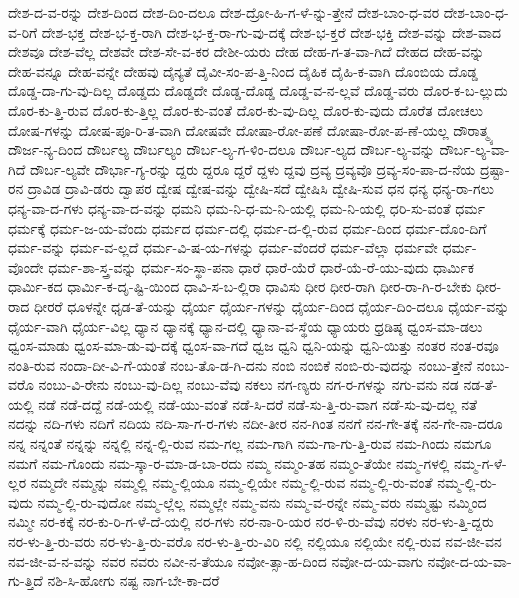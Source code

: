 {ದೇಶ-ದ-ವ-ರನ್ನು
ದೇಶ-ದಿಂದ
ದೇಶ-ದಿಂ-ದಲೂ
ದೇಶ-ದ್ರೋ-ಹಿ-ಗ-ಳೆ-ನ್ನು-ತ್ತೇನೆ
ದೇಶ-ಬಾಂ-ಧ-ವರ
ದೇಶ-ಬಾಂ-ಧ-ವ-ರಿಗೆ
ದೇಶ-ಭಕ್ತ
ದೇಶ-ಭ-ಕ್ತ-ರಾಗಿ
ದೇಶ-ಭ-ಕ್ತ-ರಾ-ಗು-ವು-ದಕ್ಕೆ
ದೇಶ-ಭ-ಕ್ತರೆ
ದೇಶ-ಭಕ್ತಿ
ದೇಶ-ವನ್ನು
ದೇಶ-ವಾದ
ದೇಶವೂ
ದೇಶ-ವೆಲ್ಲ
ದೇಶವೇ
ದೇಶ-ಸೇ-ವ-ಕರ
ದೇಶೀ-ಯರು
ದೇಹ
ದೇಹ-ಗ-ತ-ವಾ-ಗಿದೆ
ದೇಹದ
ದೇಹ-ವನ್ನು
ದೇಹ-ವನ್ನೂ
ದೇಹ-ವನ್ನೇ
ದೇಹವು
ದೈನ್ಯತೆ
ದೈವೀ-ಸಂ-ಪ-ತ್ತಿ-ನಿಂದ
ದೈಹಿಕ
ದೈಹಿ-ಕ-ವಾಗಿ
ದೊಂಬಿಯ
ದೊಡ್ಡ
ದೊಡ್ಡ-ದಾ-ಗು-ವು-ದಿಲ್ಲ
ದೊಡ್ಡದು
ದೊಡ್ಡದೇ
ದೊಡ್ಡ-ದೊಡ್ಡ
ದೊಡ್ಡ-ವ-ನ-ಲ್ಲವೆ
ದೊಡ್ಡ-ವರು
ದೊರ-ಕ-ಬ-ಲ್ಲುದು
ದೊರ-ಕು-ತ್ತಿ-ರುವ
ದೊರ-ಕು-ತ್ತಿಲ್ಲ
ದೊರ-ಕು-ವಂತೆ
ದೊರ-ಕು-ವು-ದಿಲ್ಲ
ದೊರ-ಕು-ವುದು
ದೊರೆತ
ದೋಚಲು
ದೋಷ-ಗಳನ್ನು
ದೋಷ-ಪೂ-ರಿ-ತ-ವಾಗಿ
ದೋಷವೇ
ದೋಷಾ-ರೋ-ಪಣೆ
ದೋಷಾ-ರೋ-ಪ-ಣೆ-ಯಲ್ಲ
ದೌರಾತ್ಮ್ಯ
ದೌರ್ಜ-ನ್ಯ-ದಿಂದ
ದೌರ್ಬಲ್ಯ
ದೌರ್ಬಲ್ಯಂ
ದೌರ್ಬ-ಲ್ಯ-ಗ-ಳಿಂ-ದಲೂ
ದೌರ್ಬ-ಲ್ಯದ
ದೌರ್ಬ-ಲ್ಯ-ವನ್ನು
ದೌರ್ಬ-ಲ್ಯ-ವಾ-ಗಿದೆ
ದೌರ್ಬ-ಲ್ಯವೇ
ದೌರ್ಭಾ-ಗ್ಯ-ರನ್ನು
ದ್ದರು
ದ್ದರೂ
ದ್ದರೆ
ದ್ದಳು
ದ್ದವು
ದ್ರವ್ಯ
ದ್ರವ್ಯವೊ
ದ್ರವ್ಯ-ಸಂ-ಪಾ-ದ-ನೆಯ
ದ್ರಷ್ಟಾ-ರನ
ದ್ರಾವಿಡ
ದ್ರಾವಿ-ಡರು
ದ್ವಾಪರ
ದ್ವೇಷ
ದ್ವೇಷ-ವನ್ನು
ದ್ವೇಷಿ-ಸದೆ
ದ್ವೇಷಿಸಿ
ದ್ವೇಷಿ-ಸುವ
ಧನ
ಧನ್ಯ
ಧನ್ಯ-ರಾ-ಗಲು
ಧನ್ಯ-ವಾ-ದ-ಗಳು
ಧನ್ಯ-ವಾ-ದ-ವನ್ನು
ಧಮನಿ
ಧಮ-ನಿ-ಧ-ಮ-ನಿ-ಯಲ್ಲಿ
ಧಮ-ನಿ-ಯಲ್ಲಿ
ಧರಿ-ಸು-ವಂತೆ
ಧರ್ಮ
ಧರ್ಮಕ್ಕೆ
ಧರ್ಮ-ಜ-ಯ-ವೆಂದು
ಧರ್ಮದ
ಧರ್ಮ-ದಲ್ಲಿ
ಧರ್ಮ-ದ-ಲ್ಲಿ-ರುವ
ಧರ್ಮ-ದಿಂದ
ಧರ್ಮ-ದೊಂ-ದಿಗೆ
ಧರ್ಮ-ವನ್ನು
ಧರ್ಮ-ವ-ಲ್ಲದೆ
ಧರ್ಮ-ವಿ-ಷ-ಯ-ಗಳನ್ನು
ಧರ್ಮ-ವೆಂದರೆ
ಧರ್ಮ-ವೆಲ್ಲಾ
ಧರ್ಮವೇ
ಧರ್ಮ-ವೊಂದೇ
ಧರ್ಮ-ಶಾ-ಸ್ತ್ರ-ವನ್ನು
ಧರ್ಮ-ಸಂ-ಸ್ಥಾ-ಪನಾ
ಧಾರೆ
ಧಾರೆ-ಯೆರೆ
ಧಾರೆ-ಯೆ-ರೆ-ಯು-ವುದು
ಧಾರ್ಮಿಕ
ಧಾರ್ಮಿ-ಕದ
ಧಾರ್ಮಿ-ಕ-ದೃ-ಷ್ಟಿ-ಯಿಂದ
ಧಾವಿ-ಸ-ಬ-ಲ್ಲಿರಾ
ಧಾವಿಸು
ಧೀರ
ಧೀರ-ರಾಗಿ
ಧೀರ-ರಾ-ಗಿ-ರ-ಬೇಕು
ಧೀರ-ರಾದ
ಧೀರರೆ
ಧೂಳನ್ನೇ
ಧೃಡ-ತೆ-ಯನ್ನು
ಧೈರ್ಯ
ಧೈರ್ಯ-ಗಳನ್ನು
ಧೈರ್ಯ-ದಿಂದ
ಧೈರ್ಯ-ದಿಂ-ದಲೂ
ಧೈರ್ಯ-ವನ್ನು
ಧೈರ್ಯ-ವಾಗಿ
ಧೈರ್ಯ-ವಿಲ್ಲ
ಧ್ಯಾನ
ಧ್ಯಾನಕ್ಕೆ
ಧ್ಯಾನ-ದಲ್ಲಿ
ಧ್ಯಾನಾ-ವ-ಸ್ಥೆಯ
ಧ್ಯಾಯರು
ಧ್ರಡಿಷ್ಠ
ಧ್ವಂಸ-ಮಾ-ಡಲು
ಧ್ವಂಸ-ಮಾಡು
ಧ್ವಂಸ-ಮಾ-ಡು-ವು-ದಕ್ಕೆ
ಧ್ವಂಸ-ವಾ-ಗದೆ
ಧ್ವಜ
ಧ್ವನಿ
ಧ್ವನಿ-ಯನ್ನು
ಧ್ವನಿ-ಯಿತ್ತು
ನಂತರ
ನಂತ-ರವೂ
ನಂತಿ-ರುವ
ನಂದಾ-ದೀ-ವಿ-ಗೆ-ಯಂತೆ
ನಂಬ-ತೊ-ಡ-ಗಿ-ದನು
ನಂಬಿ
ನಂಬಿಕೆ
ನಂಬಿ-ರು-ವುದನ್ನು
ನಂಬು-ತ್ತೇನೆ
ನಂಬು-ವರೊ
ನಂಬು-ವಿ-ರೇನು
ನಂಬು-ವು-ದಿಲ್ಲ
ನಂಬು-ವೆವು
ನಕಲು
ನಗ-ಣ್ಯರು
ನಗ-ರ-ಗಳನ್ನು
ನಗು-ವನು
ನಡ
ನಡ-ತೆ-ಯಲ್ಲಿ
ನಡೆ
ನಡೆ-ದದ್ದೆ
ನಡೆ-ಯಲ್ಲಿ
ನಡೆ-ಯು-ವಂತೆ
ನಡೆ-ಸಿ-ದರೆ
ನಡೆ-ಸು-ತ್ತಿ-ರು-ವಾಗ
ನಡೆ-ಸು-ವು-ದಲ್ಲ
ನತೆ
ನದನ್ನು
ನದಿ-ಗಳು
ನದಿಗೆ
ನದಿಯ
ನದಿ-ಸಾ-ಗ-ರ-ಗಳು
ನದೀ-ತೀರ
ನನ-ಗಿಂತ
ನನಗೆ
ನನ-ಗೇ-ತಕ್ಕೆ
ನನ-ಗೇ-ನಾ-ದರೂ
ನನ್ನ
ನನ್ನಂತೆ
ನನ್ನನ್ನು
ನನ್ನಲ್ಲಿ
ನನ್ನ-ಲ್ಲಿ-ರುವ
ನಮ-ಗಲ್ಲ
ನಮ-ಗಾಗಿ
ನಮ-ಗಾ-ಗು-ತ್ತಿ-ರುವ
ನಮ-ಗಿಂದು
ನಮಗೂ
ನಮಗೆ
ನಮ-ಗೊಂದು
ನಮ-ಸ್ಕಾ-ರ-ಮಾ-ಡ-ಬಾ-ರದು
ನಮ್ಮ
ನಮ್ಮಂ-ತಹ
ನಮ್ಮಂ-ತೆಯೇ
ನಮ್ಮ-ಗಳಲ್ಲಿ
ನಮ್ಮ-ಗ-ಳೆ-ಲ್ಲರ
ನಮ್ಮದೇ
ನಮ್ಮನ್ನು
ನಮ್ಮಲ್ಲಿ
ನಮ್ಮ-ಲ್ಲಿಯೂ
ನಮ್ಮ-ಲ್ಲಿಯೇ
ನಮ್ಮ-ಲ್ಲಿ-ರುವ
ನಮ್ಮ-ಲ್ಲಿ-ರು-ವಂತೆ
ನಮ್ಮ-ಲ್ಲಿ-ರು-ವುದು
ನಮ್ಮ-ಲ್ಲಿ-ರು-ವುದೋ
ನಮ್ಮ-ಲ್ಲೆಲ್ಲ
ನಮ್ಮಲ್ಲೇ
ನಮ್ಮ-ವನು
ನಮ್ಮ-ವ-ರನ್ನೇ
ನಮ್ಮ-ವರು
ನಮ್ಮಷ್ಟು
ನಮ್ಮಿಂದ
ನಮ್ಮೀ
ನರ-ಕಕ್ಕೆ
ನರ-ಕು-ರಿ-ಗ-ಳೆ-ದೆ-ಯಲ್ಲಿ
ನರ-ಗಳು
ನರ-ನಾ-ರಿ-ಯರ
ನರ-ಳಿ-ರು-ವೆವು
ನರಳು
ನರ-ಳು-ತ್ತಿ-ದ್ದರು
ನರ-ಳು-ತ್ತಿ-ರು-ವರು
ನರ-ಳು-ತ್ತಿ-ರು-ವರೊ
ನರ-ಳು-ತ್ತಿ-ರು-ವಿರಿ
ನಲ್ಲಿ
ನಲ್ಲಿಯೂ
ನಲ್ಲಿಯೇ
ನಲ್ಲಿ-ರುವ
ನವ-ಜೀ-ವನ
ನವ-ಜೀ-ವ-ನ-ವನ್ನು
ನವರ
ನವರು
ನವೀ-ನ-ತೆಯೂ
ನವೋ-ತ್ಸಾ-ಹ-ದಿಂದ
ನವೋ-ದ-ಯ-ವಾಗು
ನವೋ-ದ-ಯ-ವಾ-ಗು-ತ್ತಿದೆ
ನಶಿ-ಸಿ-ಹೋಗು
ನಷ್ಟ
ನಾಗ-ಬೇ-ಕಾ-ದರೆ
}
